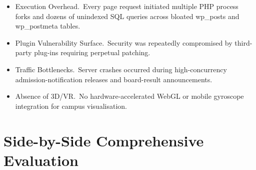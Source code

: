 \documentclass[12pt, a4paper, oneside]{report}
\def\textbf#1{#1}
\def\texttt#1{#1}
\begin{document}
\begin{itemize}
  \item \textbf{Execution Overhead.}\ Every page request initiated multiple PHP
        process forks and dozens of unindexed SQL queries across bloated
        \texttt{wp\_posts} and \texttt{wp\_postmeta} tables.
  \item \textbf{Plugin Vulnerability Surface.}\ Security was repeatedly
        compromised by third-party plug-ins requiring perpetual patching.
  \item \textbf{Traffic Bottlenecks.}\ Server crashes occurred during
        high-concurrency admission-notification releases and board-result
        announcements.
  \item \textbf{Absence of 3D/VR.}\ No hardware-accelerated WebGL or mobile
        gyroscope integration for campus visualisation.
\end{itemize}

\section{Side-by-Side Comprehensive Evaluation}
\end{document}
